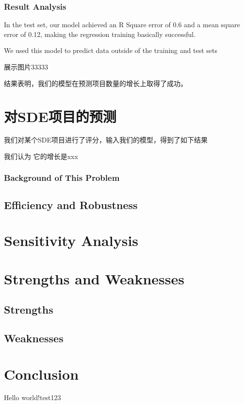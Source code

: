 \documentclass[a4paper]{article}
\begin{document}
\subsubsection{Result Analysis}
In the test set, our model achieved an R Square error of 0.6 and a mean square error of 0.12, making the regression training basically successful.

We used this model to predict data outside of the training and test sets

展示图片33333

结果表明，我们的模型在预测项目数量的增长上取得了成功。



\section{对SDE项目的预测}
我们对某个SDE项目进行了评分，输入我们的模型，得到了如下结果

我们认为 它的增长是xxx
\subsubsection{Background of This Problem}
\subsection{Efficiency and Robustness}
\section{Sensitivity Analysis}
\section{Strengths and Weaknesses}
\subsection{Strengths}
\subsection{Weaknesses}
\section{Conclusion}
Hello world!test123
\end{document}
